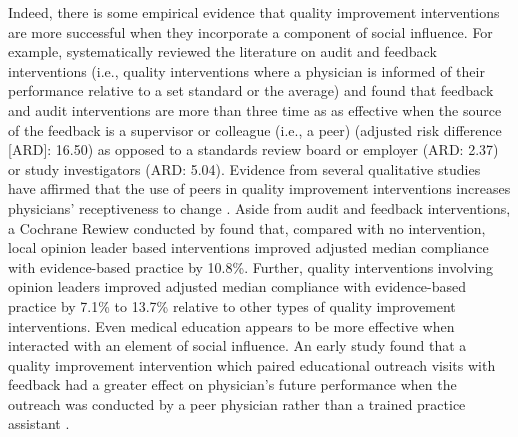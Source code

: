 \documentclass[11pt]{article}
\begin{document}
Indeed, there is some empirical evidence that quality improvement interventions are more successful when they incorporate a component of social influence. For example, \citet{iversAuditFeedbackEffects2012} systematically reviewed the literature on audit and feedback interventions (i.e., quality interventions where a physician is informed of their performance relative to a set standard or the average) and found that feedback and audit interventions are more than three time as as effective when the source of the feedback is a supervisor or colleague (i.e., a peer) (adjusted risk difference [ARD]: 16.50) as opposed to a standards review board or employer (ARD: 2.37) or study investigators (ARD: 5.04). Evidence from several qualitative studies have affirmed that the use of peers in quality improvement interventions increases physicians' receptiveness to change \citep{fergusonFactorsInfluencingEffectiveness2014}. Aside from audit and feedback interventions, a Cochrane Rewiew conducted by \citet{flodgrenLocalOpinionLeaders2019} found that, compared with no intervention, local opinion leader based interventions improved adjusted median compliance with evidence-based practice by 10.8\%. Further, quality interventions involving opinion leaders improved adjusted median compliance with evidence-based practice by 7.1\% to 13.7\% relative to other types of quality improvement interventions. Even medical education appears to be more effective when interacted with an element of social influence. An early study found that a quality improvement intervention which paired educational outreach visits with feedback had a greater effect on physician's future performance when the outreach was conducted by a peer physician rather than a trained practice assistant \citep{vandenhomberghPracticeVisitsTool1999}.
\end{document}
